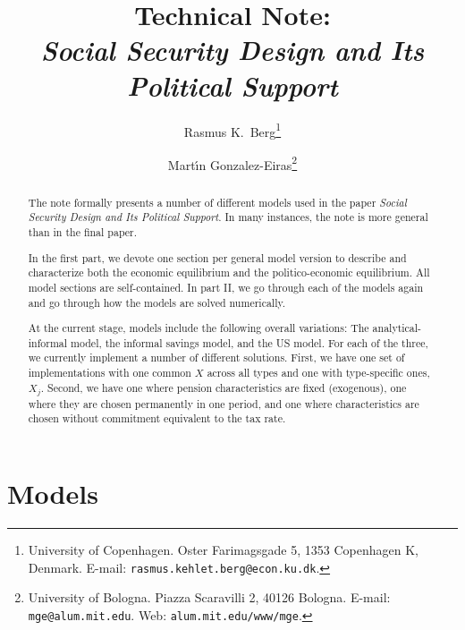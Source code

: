 \documentclass[a4paper]{article}
\begin{document}

\title{Technical Note: \\
\emph{Social Security Design and Its Political Support}}

\author{Rasmus K.\ Berg\thanks{University of Copenhagen. Oster Farimagsgade 5, 1353 Copenhagen K, Denmark. E-mail: \texttt{rasmus.kehlet.berg@econ.ku.dk}.}
\and
Mart\'{\i}n Gonzalez-Eiras\thanks{University of Bologna. Piazza Scaravilli 2, 40126 Bologna. E-mail: \texttt{mge@alum.mit.edu}. Web: \texttt{alum.mit.edu/www/mge}.}}
\maketitle


\begin{abstract}
\noindent 
The note formally presents a number of different models used in the paper \textit{Social Security Design and Its Political Support}. In many instances, the note is more general than in the final paper. 

In the first part, we devote one section per general model version to describe and characterize both the economic equilibrium and the politico-economic equilibrium. All model sections are self-contained. In part II, we go through each of the models again and go through how the models are solved numerically.


At the current stage, models include the following overall variations: The analytical-informal model, the informal savings model, and the US model. For each of the three, we currently implement a number of different solutions. First, we have one set of implementations with one common $X$ across all types and one with type-specific ones, $X_j$. Second, we have one where pension characteristics are fixed (exogenous), one where they are chosen permanently in one period, and one where characteristics are chosen without commitment equivalent to the tax rate. 
\end{abstract}

\clearpage
\part{Models}\label{part:models}
\end{document}
